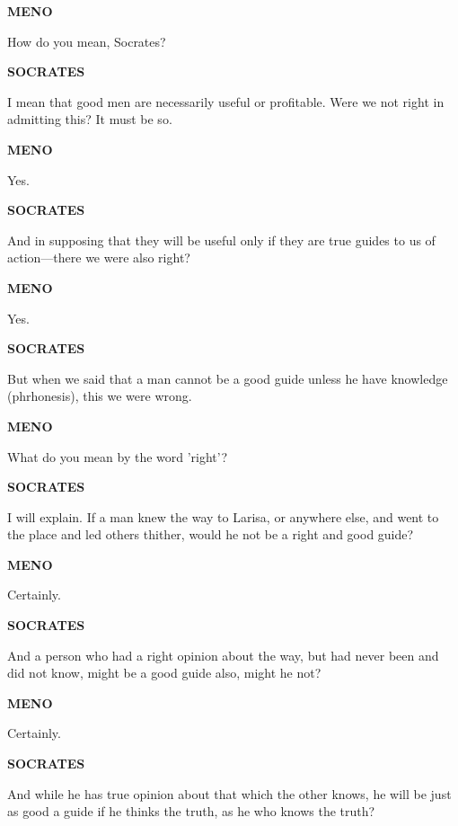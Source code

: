 \documentclass[11pt,letter]{article}
\begin{document}
\par \textbf{MENO}
\par   How do you mean, Socrates?

\par \textbf{SOCRATES}
\par   I mean that good men are necessarily useful or profitable. Were we not right in admitting this? It must be so.

\par \textbf{MENO}
\par   Yes.

\par \textbf{SOCRATES}
\par   And in supposing that they will be useful only if they are true guides to us of action—there we were also right?

\par \textbf{MENO}
\par   Yes.

\par \textbf{SOCRATES}
\par   But when we said that a man cannot be a good guide unless he have knowledge (phrhonesis), this we were wrong.

\par \textbf{MENO}
\par   What do you mean by the word 'right'?

\par \textbf{SOCRATES}
\par   I will explain. If a man knew the way to Larisa, or anywhere else, and went to the place and led others thither, would he not be a right and good guide?

\par \textbf{MENO}
\par   Certainly.

\par \textbf{SOCRATES}
\par   And a person who had a right opinion about the way, but had never been and did not know, might be a good guide also, might he not?

\par \textbf{MENO}
\par   Certainly.

\par \textbf{SOCRATES}
\par   And while he has true opinion about that which the other knows, he will be just as good a guide if he thinks the truth, as he who knows the truth?
\end{document}
